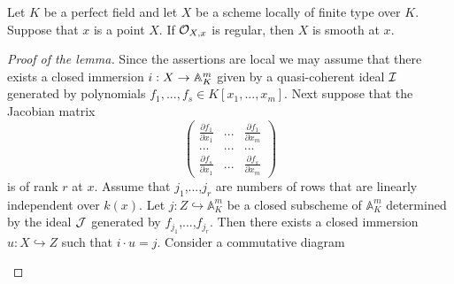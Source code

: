 \begin{lemma}\label{lemma:for_perfect_fields_regular_implies_smooth}
Let $K$ be a perfect field and let $X$ be a scheme locally of finite type over $K$. Suppose that $x$ is a point $X$. If ${\mathcal O}_{X,x}$ is regular, then $X$ is smooth at $x$.
\end{lemma}
\begin{proof}[Proof of the lemma]
Since the assertions are local we may assume that there exists a closed immersion $i:X\rightarrow \mathbb{A}^m_K$ given by a quasi-coherent ideal ${\mathcal I}$ generated by polynomials $f_1,...,f_s\in K[x_1,...,x_m]$. Next suppose that the Jacobian matrix
$$\left( \begin{array}{ccc}
\frac{\partial f_1}{\partial x_1} & ... & \frac{\partial f_1}{\partial x_{m}} \\
... &...  &...  \\
\frac{\partial f_s}{\partial x_{1}} &...  & \frac{\partial f_s}{\partial x_{m}}\end{array} \right)$$
is of rank $r$ at $x$. Assume that $j_1$,...,$j_r$ are numbers of rows that are linearly independent over $k(x)$. Let $j:Z\hookrightarrow \mathbb{A}^m_K$ be a closed subscheme of $\mathbb{A}^m_K$ determined by the ideal ${\mathcal J}$ generated by $f_{j_1}$,...,$f_{j_r}$. Then there exists a closed immersion $u:X\hookrightarrow Z$ such that $i\cdot u = j$. Consider a commutative diagram
\begin{center}
\end{center}
\end{proof}

